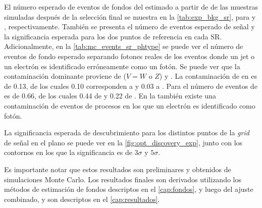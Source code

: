 El número esperado de eventos de fondos del {\SM} estimado a partir de de las
muestras simuladas después de la selección final se muestra en la
\cref{tab:exp_bkg_sr}, para {\SRL} y {\SRH},
respectivamente. También se presenta el número de eventos esperado de señal y la
significancia esperada para los dos puntos de referencia en cada SR.
Adicionalmente, en la \cref{tab:mc_events_sr_phtype} se puede ver el número de
eventos de fondo esperado separando fotones reales de los eventos donde un jet o
un electrón es identificado erróneamente como un fotón.
Se puede ver que la contaminación dominante proviene de {\vgam} ($V=W \text{ o }
Z$) y {\ttgam}. La contaminación de {\vgam} en {\SRL} es de 0.13, de los cuales
0.10 corresponden a {\wgam} y 0.03 a {\znngam}. Para {\SRH} el número de eventos
de {\vgam} es de 0.66, de los cuales 0.44 de {\wgam} y 0.22 de {\znngam}. En la
{\SRL} también existe una contaminación de eventos de procesos {\ttbar} en los
que un electrón es identificado como fotón.

La significancia esperada de descubrimiento para los distintos puntos
de la \emph{grid} de señal en el plano {\mgmn} se puede ver en la
\cref{fig:opt_discovery_exp}, junto con los contornos en los que la significancia
es de $3\sigma$ y $5\sigma$.

Es
importante notar que estos resultados son preliminares y obtenidos de
simulaciones Monte Carlo. Los resultados finales son derivados utilizando los
métodos de estimación de fondos descriptos en el \cref{cap:fondos}, y luego
del ajuste combinado, y son descriptos en el \cref{cap:resultados}.

